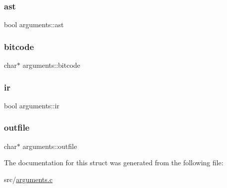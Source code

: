 \hypertarget{structarguments_a381e594653be3e9d540a3b789992bf10}{}\label{structarguments_a381e594653be3e9d540a3b789992bf10} 
\subsubsection{\texorpdfstring{ast}{ast}}
{\footnotesize\ttfamily bool arguments\+::ast}

\hypertarget{structarguments_ad7610191c7845a084b9c1bd77bdfd5ef}{}\label{structarguments_ad7610191c7845a084b9c1bd77bdfd5ef} 
\subsubsection{\texorpdfstring{bitcode}{bitcode}}
{\footnotesize\ttfamily char$\ast$ arguments\+::bitcode}

\hypertarget{structarguments_ab1aff07fb71d590783ff6f274d814bc2}{}\label{structarguments_ab1aff07fb71d590783ff6f274d814bc2} 
\subsubsection{\texorpdfstring{ir}{ir}}
{\footnotesize\ttfamily bool arguments\+::ir}

\hypertarget{structarguments_aa3e057ae365454e2918a8c6ca4800822}{}\label{structarguments_aa3e057ae365454e2918a8c6ca4800822} 
\subsubsection{\texorpdfstring{outfile}{outfile}}
{\footnotesize\ttfamily char$\ast$ arguments\+::outfile}



The documentation for this struct was generated from the following file\+:\begin{DoxyCompactItemize}
\item 
src/\hyperlink{arguments_8c}{arguments.\+c}\end{DoxyCompactItemize}

